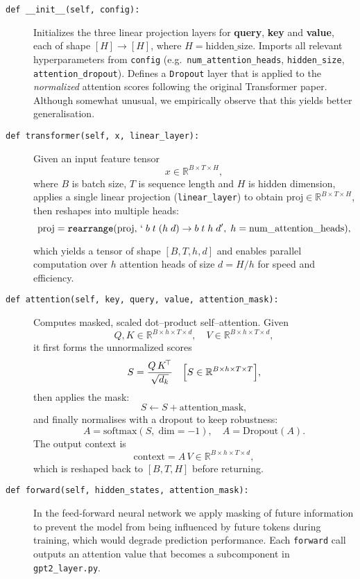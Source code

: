 \documentclass{article}
\theoremstyle{definition}
\begin{document}
\begin{description}
  \item[\texttt{def \_\_init\_\_(self, config):}] 
    Initializes the three linear projection layers for \textbf{query}, \textbf{key} and \textbf{value}, each of shape $[H]\!\to\![H]$, where $H=\text{hidden\_size}$.  Imports all relevant hyperparameters from \texttt{config} (e.g.\ \texttt{num\_attention\_heads}, \texttt{hidden\_size}, \texttt{attention\_dropout}).  Defines a \texttt{Dropout} layer that is applied to the \emph{normalized} attention scores following the original Transformer paper.  Although somewhat unusual, we empirically observe that this yields better generalisation.

  \item[\texttt{def transformer(self, x, linear\_layer):}]
    Given an input feature tensor 
    \[
      x\in\mathbb{R}^{B\times T\times H},
    \] 
    where $B$ is batch size, $T$ is sequence length and $H$ is hidden dimension, applies a single linear projection (\texttt{linear\_layer}) to obtain 
    \(\displaystyle \mathrm{proj}\in\mathbb{R}^{B\times T\times H}\), then reshapes into multiple heads:
    \[
      \text{proj}
        =\texttt{rearrange}(\text{proj},\,`\;b\;t\;(h\;d)\to b\;t\;h\;d',\;h=\text{num\_attention\_heads}),
    \]

    which yields a tensor of shape $[B,T,h,d]$ and enables parallel computation over $h$ attention heads of size $d=H/h$ for speed and efficiency.

  \item[\texttt{def attention(self, key, query, value, attention\_mask):}]
    Computes masked, scaled dot–product self–attention.  Given
    \[
      Q,K\in\mathbb{R}^{B\times h\times T\times d},\quad
      V\in\mathbb{R}^{B\times h\times T\times d},
    \]
    it first forms the unnormalized scores
    \[
      S = \frac{Q\,K^{\!\top}}{\sqrt{d_k}}\quad\Bigl[S\in\mathbb{R}^{B\times h\times T\times T}\Bigr],
    \]
    then applies the mask:
    \[
      S \leftarrow S + \text{attention\_mask},
    \]
    and finally normalises with a dropout to keep robustness:
    \[
      A = \mathrm{softmax}(S,\;\mathrm{dim}=-1),\quad
      A = \mathrm{Dropout}(A).
    \]
    The output context is
    \[
      \text{context} = A\,V\in\mathbb{R}^{B\times h\times T\times d},
    \]
    which is reshaped back to $[B,T,H]$ before returning.

    \item[\texttt{def forward(self, hidden\_states, attention\_mask):}]
    In the feed‐forward neural network we apply masking 
    of future information to prevent the model 
    from being influenced by future tokens during training, 
    which would degrade prediction performance. 
    Each \texttt{forward} call outputs an attention value 
    that becomes a subcomponent in \texttt{gpt2\_layer.py}.
    
\end{description}
\end{document}

